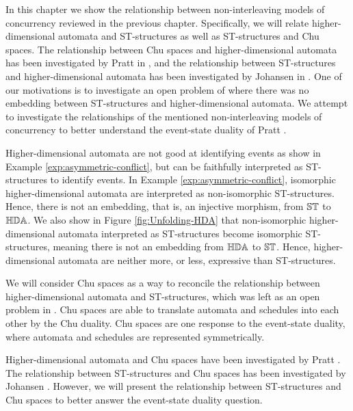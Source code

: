 In this chapter we show the relationship between non-interleaving models of concurrency reviewed in the previous chapter. Specifically, we will relate higher-dimensional automata and ST-structures as well as ST-structures and Chu spaces. The relationship between Chu spaces and higher-dimensional automata has been investigated by Pratt in \cite{Pratt02eventStateDuality}, and the relationship between ST-structures and higher-dimensional automata has been investigated by Johansen in \cite{Johansen16STstruct}. One of our motivations is to investigate an open problem of \cite{Johansen16STstruct} where there was no embedding between ST-structures and higher-dimensional automata. We attempt to investigate the relationships of the mentioned non-interleaving models of concurrency to better understand the event-state duality of Pratt \cite{Pratt02eventStateDuality}.

Higher-dimensional automata are not good at identifying events as show in Example \ref{exp:asymmetric-conflict}, but can be faithfully interpreted as ST-structures to identify events. In Example \ref{exp:asymmetric-conflict}, isomorphic higher-dimensional automata are interpreted as non-isomorphic ST-structures. Hence, there is not an embedding, that is, an injective morphism, from $\mathbb{ST}$ to $\mathbb{HDA}$. We also show in Figure \ref{fig:Unfolding-HDA} that non-isomorphic higher-dimensional automata interpreted as ST-structures become isomorphic ST-structures, meaning there is not an embedding from $\mathbb{HDA}$ to $\mathbb{ST}$. Hence, higher-dimensional automata are neither more, or less, expressive than ST-structures.

We will consider Chu spaces as a way to reconcile the relationship between higher-dimensional automata and ST-structures, which was left as an open problem in \cite{Johansen16STstruct}. Chu spaces are able to translate automata and schedules into each other by the Chu duality. Chu spaces are one response to the event-state duality, where automata and schedules are represented symmetrically. 

Higher-dimensional automata and Chu spaces have been investigated by Pratt \cite{Pratt02eventStateDuality}. The relationship between ST-structures and Chu spaces has been investigated by Johansen \cite{Johansen16STstruct}. However, we will present the relationship between ST-structures and Chu spaces to better answer the event-state duality question.
